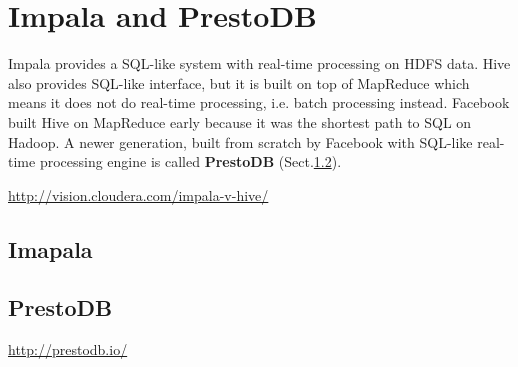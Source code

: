\chapter{Impala and PrestoDB}
\label{chap:Impala}

Impala provides a SQL-like system with real-time processing on HDFS data. Hive
also provides SQL-like interface, but it is built on top of MapReduce which
means it does not do real-time processing, i.e. batch processing instead. 
Facebook built Hive on MapReduce early because it was the shortest path to SQL
on Hadoop. A newer generation, built from scratch by Facebook with SQL-like
real-time processing engine is called {\bf PrestoDB} (Sect.\ref{sec:PrestoDB}).

\url{http://vision.cloudera.com/impala-v-hive/}


\section{Imapala}
\label{sec:Impala}


\section{PrestoDB}
\label{sec:PrestoDB}

\url{http://prestodb.io/}